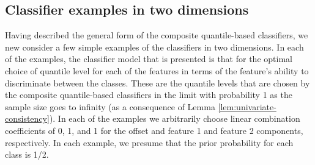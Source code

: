 

\subsection{Classifier examples in two dimensions}
\label{sec:classifier-examples}

Having described the general form of the composite quantile-based classifiers,
we new consider a few simple examples of the classifiers in two dimensions.  In
each of the examples, the classifier model that is presented is that for the
optimal choice of quantile level for each of the features in terms of the
feature's ability to discriminate between the classes.  These are the quantile
levels that are chosen by the composite quantile-based classifiers in the limit
with probability 1 as the sample size goes to infinity (as a consequence of
Lemma \ref{lem:univariate-consistency}).  In each of the examples we arbitrarily
choose linear combination coefficients of 0, 1, and 1 for the offset and feature
1 and feature 2 components, respectively.  In each example, we presume that the
prior probability for each class is 1/2.


